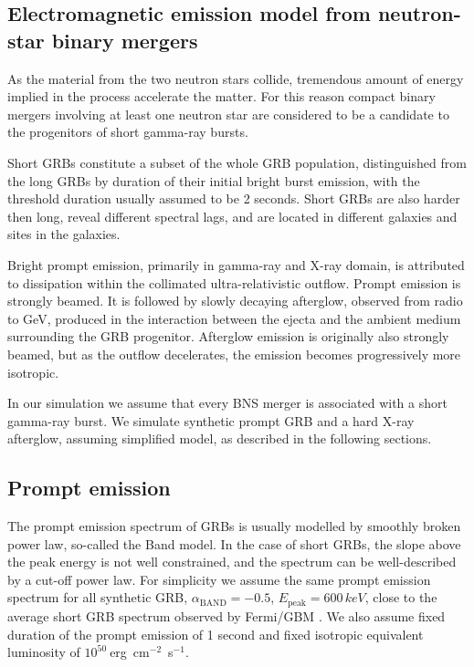 \documentclass[a0,portrait]{a0poster}
\newcommand{\ECM}[1] {\textbf{\textcolor{magenta}{#1}}}
\begin{document}
\begin{multicols}{2}
\section*{Electromagnetic emission model from neutron-star binary mergers}

As the material from the two neutron stars collide, tremendous amount
of energy implied in the process accelerate the matter. For this
reason compact binary mergers involving at least one neutron star are
considered to be a candidate to the progenitors of short gamma-ray
bursts.

 Short GRBs constitute a subset of the whole GRB population,
 distinguished from the long GRBs by duration of their initial bright
 burst emission, with the threshold duration usually assumed to be 2
 seconds. Short GRBs are also harder then long, reveal different
 spectral lags, and are located in different galaxies and sites in the
 galaxies.

Bright prompt emission, primarily in gamma-ray and X-ray domain, is
attributed to dissipation within the collimated ultra-relativistic
outflow. Prompt emission is strongly beamed. It is followed by slowly
decaying afterglow, observed from radio to GeV, produced in the
interaction between the ejecta and the ambient medium surrounding the
GRB progenitor. Afterglow emission is originally also strongly beamed,
but as the outflow decelerates, the emission becomes progressively
more isotropic.

In our simulation we assume that every BNS merger is associated with a
short gamma-ray burst. We simulate synthetic prompt GRB and a hard
X-ray afterglow, assuming simplified model, as described in the
following sections.

\subsection*{Prompt emission}


The prompt emission spectrum of GRBs is usually modelled by smoothly
broken power law, so-called the Band \citep{band93} model. In the case
of short GRBs, the slope above the peak energy is not well
constrained, and the spectrum can be well-described by a cut-off
power law. For simplicity we assume the same prompt emission spectrum
for all synthetic GRB, $\alpha_{\mathrm{BAND}} = - 0.5$,
$E_{\mathrm{peak}} = 600 \, keV$, close to the average short GRB
spectrum observed by Fermi/GBM \citep{gruber14}. We also assume fixed
duration of the prompt emission of 1 second and fixed isotropic
equivalent luminosity of $10^{50}~$erg~cm$^{-2}$~s$^{-1}$.


\end{multicols}
\end{document}
